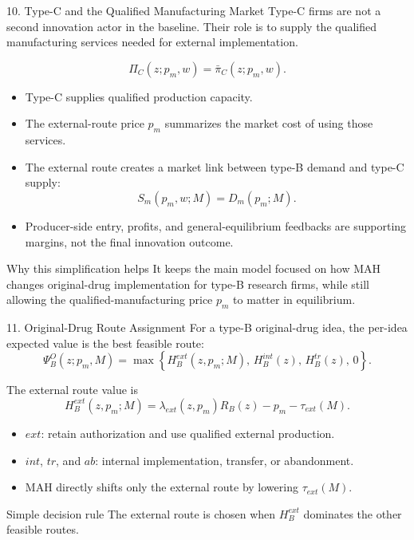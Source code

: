\documentclass[aspectratio=169,11pt]{beamer}
\begin{document}
\begin{frame}{10. Type-C and the Qualified Manufacturing Market}
\small
Type-C firms are not a second innovation actor in the baseline. Their role is to supply the
qualified manufacturing services needed for external implementation.

\vspace{0.1cm}
\[
\Pi_C(z;p_m,w)=\bar\pi_C(z;p_m,w).
\]

\begin{itemize}
\item Type-C supplies qualified production capacity.
\item The external-route price \(p_m\) summarizes the market cost of using those services.
\item The external route creates a market link between type-B demand and type-C supply:
\[
S_m(p_m,w;M)=D_m(p_m;M).
\]
\item Producer-side entry, profits, and general-equilibrium feedbacks are supporting margins, not the final innovation outcome.
\end{itemize}

\begin{block}{Why this simplification helps}
It keeps the main model focused on how MAH changes original-drug implementation for type-B research firms, while still allowing the qualified-manufacturing price \(p_m\) to matter in equilibrium.
\end{block}
\end{frame}

\begin{frame}{11. Original-Drug Route Assignment}
\small
For a type-B original-drug idea, the per-idea expected value is the best feasible route:
\[
\Psi_B^O(z;p_m,M)=\max\left\{H_B^{ext}(z,p_m;M),\,H_B^{int}(z),\,H_B^{tr}(z),\,0\right\}.
\]

\vspace{0.05cm}
The external route value is
\[
H_B^{ext}(z,p_m;M)
=\lambda_{ext}(z,p_m)R_B(z)-p_m-\tau_{ext}(M).
\]

\begin{itemize}
\item \(ext\): retain authorization and use qualified external production.
\item \(int\), \(tr\), and \(ab\): internal implementation, transfer, or abandonment.
\item MAH directly shifts only the external route by lowering \(\tau_{ext}(M)\).
\end{itemize}

\begin{block}{Simple decision rule}
The external route is chosen when \(H_B^{ext}\) dominates the other feasible routes.
\end{block}
\end{frame}
\end{document}
